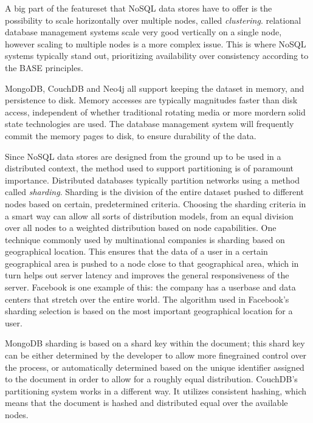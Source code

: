 A big part of the featureset that NoSQL data stores have to offer is the possibility to scale horizontally over multiple nodes, called \textit{clustering}.
 relational database management systems scale very good vertically on a single node, however scaling to multiple nodes is a more complex issue.
This is where NoSQL systems typically stand out, prioritizing availability over consistency according to the BASE principles.

MongoDB, CouchDB and Neo4j all support keeping the dataset in memory, and persistence to disk.
Memory accesses are typically magnitudes faster than disk access, independent of whether traditional rotating media or more mordern solid state technologies are used.
The database management system will frequently commit the memory pages to disk, to ensure durability of the data.

Since NoSQL data stores are designed from the ground up to be used in a distributed context, the method used to support partitioning is of paramount importance.
Distributed databases typically partition networks using a method called \textit{sharding}.
Sharding is the division of the entire dataset pushed to different nodes based on certain, predetermined criteria.
Choosing the sharding criteria in a smart way can allow all sorts of distribution models, from an equal division over all nodes to a weighted distribution based on node capabilities.
One technique commonly used by multinational companies is sharding based on geographical location.
This ensures that the data of a user in a certain geographical area is pushed to a node close to that geographical area, which in turn helps out server latency and improves the general responsiveness of the server.
Facebook is one example of this: the company has a userbase and data centers that stretch over the entire world.
The algorithm used in Facebook's sharding selection is based on the most important geographical location for a user.

MongoDB sharding is based on a shard key within the document; this shard key can be either determined by the developer to allow more finegrained control over the process, or automatically determined based on the unique identifier assigned to the document in order to allow for a roughly equal distribution.
CouchDB's partitioning system works in a different way.
It utilizes consistent hashing, which means that the document is hashed and distributed equal over the available nodes.

